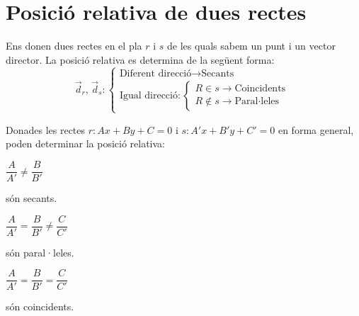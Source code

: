 \documentclass[11pt, a4paper, pdf]{article}
\begin{document}
\vspace{-0.5cm}
\section{Posició relativa de dues rectes}
\begin{theorybox}
	Ens donen dues rectes en el pla $r$ i $s$ de les quals sabem un punt i un vector director. La posició relativa es determina de la següent forma:
	\begin{equation}
	\vec d_r,\, \vec d_s : \left\{
	\begin{array}{l}
	\text{Diferent direcció} \rightarrow \text{Secants} \\
	\text{Igual direcció}:\left\{
	\begin{array}{l}
	R \in s \rightarrow \text{Coincidents} \\
	R \notin s \rightarrow \text{Paral·leles}
	\end{array}
	\right.
	\end{array}
	\right.
	\end{equation}
\end{theorybox}

\vspace{-0.5cm}

\begin{theorybox}
	Donades les rectes $r: Ax+By+C=0$ i $s: A'x+B'y+C'=0$ en forma general, poden determinar la posició relativa:
	\vspace{-0.25cm}
	\begin{multicols}{3}
		$\dfrac{A}{A'}\neq \dfrac{B}{B'}$ 
		
		són secants.
		
		$\dfrac{A}{A'} = \dfrac{B}{B'} \neq \dfrac{C}{C'}$ 
		
		són paral·leles.
		
		$\dfrac{A}{A'} = \dfrac{B}{B'} = \dfrac{C}{C'}$ 
		
		són coincidents.
	\end{multicols}
\end{theorybox}	
 
\end{document}

